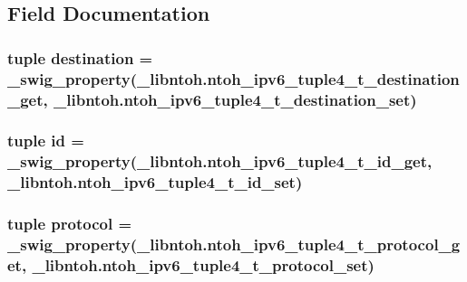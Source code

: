 \subsection{Field Documentation}
\hypertarget{classlibntoh_1_1ntoh__ipv6__tuple4__t_adaac82457baf1096d1c38cadf8123ce7}{
\subsubsection[{destination}]{\setlength{\rightskip}{0pt plus 5cm}tuple destination = {\bf \-\_\-swig\-\_\-property}(\-\_\-libntoh.\-ntoh\-\_\-ipv6\-\_\-tuple4\-\_\-t\-\_\-destination\-\_\-get, \-\_\-libntoh.\-ntoh\-\_\-ipv6\-\_\-tuple4\-\_\-t\-\_\-destination\-\_\-set)\hspace{0.3cm}{\ttfamily [static]}}}\label{classlibntoh_1_1ntoh__ipv6__tuple4__t_adaac82457baf1096d1c38cadf8123ce7}
\hypertarget{classlibntoh_1_1ntoh__ipv6__tuple4__t_a0e43f6071072440917ee2dd8af07d251}{
\subsubsection[{id}]{\setlength{\rightskip}{0pt plus 5cm}tuple id = {\bf \-\_\-swig\-\_\-property}(\-\_\-libntoh.\-ntoh\-\_\-ipv6\-\_\-tuple4\-\_\-t\-\_\-id\-\_\-get, \-\_\-libntoh.\-ntoh\-\_\-ipv6\-\_\-tuple4\-\_\-t\-\_\-id\-\_\-set)\hspace{0.3cm}{\ttfamily [static]}}}\label{classlibntoh_1_1ntoh__ipv6__tuple4__t_a0e43f6071072440917ee2dd8af07d251}
\hypertarget{classlibntoh_1_1ntoh__ipv6__tuple4__t_ae535ff0dd346855882bd298a9e22bbc1}{
\subsubsection[{protocol}]{\setlength{\rightskip}{0pt plus 5cm}tuple protocol = {\bf \-\_\-swig\-\_\-property}(\-\_\-libntoh.\-ntoh\-\_\-ipv6\-\_\-tuple4\-\_\-t\-\_\-protocol\-\_\-get, \-\_\-libntoh.\-ntoh\-\_\-ipv6\-\_\-tuple4\-\_\-t\-\_\-protocol\-\_\-set)\hspace{0.3cm}{\ttfamily [static]}}}\label{classlibntoh_1_1ntoh__ipv6__tuple4__t_ae535ff0dd346855882bd298a9e22bbc1}
